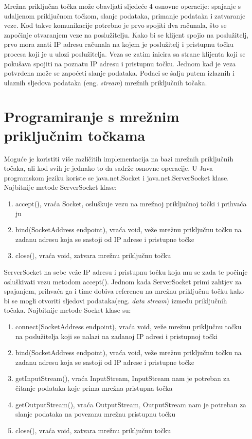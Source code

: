 \documentclass[times, utf8, zavrsni, square]{fer}
\begin{document}
Mrežna priključna točka može obavljati sljedeće 4 osnovne operacije: spajanje s udaljenom priključnom točkom, slanje podataka, primanje podataka i zatvaranje veze.
Kod takve komunikacije potrebno je prvo spojiti dva računala, što se započinje otvaranjem veze na poslužitelju.
Kako bi se klijent spojio na poslužitelj, prvo mora znati IP adresu računala na kojem je poslužitelj i pristupnu točku procesa koji je u ulozi poslužitelja.
Veza se zatim inicira sa strane klijenta koji se pokušava spojiti na poznatu IP adresu i pristupnu točku.
Jednom kad je veza potvrđena može se započeti slanje podataka.
Podaci se šalju putem izlaznih i ulaznih sljedova podataka (eng. \textit{stream}) mrežnih priključnih točaka.

\FloatBarrier
\section{Programiranje s mrežnim priključnim točkama}
Moguće je koristiti više različitih implementacija na bazi mrežnih priključnih točaka, ali kod svih je jednako to da sadrže osnovne operacije.
U Java programskom jeziku koriste se java.net.Socket i java.net.ServerSocket klase\cite{oracle}.
Najbitnije metode ServerSocket klase:

\begin{enumerate}
    \itemsep0em
    \item accept(), vraća Socket, osluškuje vezu na mrežnoj priključnoj točki i prihvaća ju
    \item bind(SocketAddress endpoint), vraća void, veže mrežnu priključnu točku na zadanu adresu koja se sastoji od IP adrese i pristupne točke
    \item close(), vraća void, zatvara mrežnu priključnu točku
    \end{enumerate}

ServerSocket na sebe veže IP adresu i pristupnu točku koja mu se zada te počinje osluškivati vezu metodom accept().
Jednom kada ServerSocket primi zahtjev za spajanjem, prihvaća ga i time dobiva referencu na mrežnu priključnu točku kako bi se mogli otvoriti sljedovi podataka(eng. \textit{data stream}) između priključnih točaka.
Najbitnije metode Socket klase su:


\begin{enumerate}
    \itemsep0em
    \item connect(SocketAddress endpoint), vraća void, veže mrežnu priključnu točku na poslužitelja koji se nalazi na zadanoj IP adresi i pristupnoj točki
    \item bind(SocketAddress endpoint), vraća void, veže mrežnu priključnu točku na zadanu adresu koja se sastoji od IP adrese i pristupne točke
    \item getInputStream(), vraća InputStream, InputStream nam je potreban za čitanje podataka koje prima mrežna pristupna točka
    \item getOutputStream(), vraća OutputStream, OutputStream nam je potreban za slanje podataka na povezanu mrežnu pristupnu točku
    \item close(), vraća void, zatvara mrežnu priključnu točku
    \end{enumerate}
\end{document}
